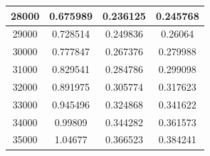 \begin{center}
\begin{tabular}{| c | c | c | c |}
28000 & 0.675989 & 0.236125 & 0.245768 \\ \hline
29000 & 0.728514 & 0.249836 & 0.26064 \\ \hline
30000 & 0.777847 & 0.267376 & 0.279988 \\ \hline
31000 & 0.829541 & 0.284786 & 0.299098 \\ \hline
32000 & 0.891975 & 0.305774 & 0.317623 \\ \hline
33000 & 0.945496 & 0.324868 & 0.341622 \\ \hline
34000 & 0.99809 & 0.344282 & 0.361573 \\ \hline
35000 & 1.04677 & 0.366523 & 0.384241 \\ \hline
\hline
\end{tabular}
\end{center}
